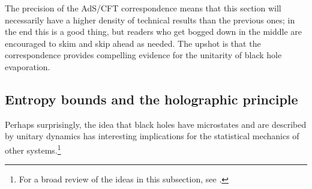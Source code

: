 \documentclass[12pt]{article}
\begin{document}
The precision of the AdS/CFT correspondence means that this section will necessarily have a higher density of technical results than the previous ones; in the end this is a good thing, but readers who get bogged down in the middle are encouraged to skim and skip ahead as needed.  The upshot is that the correspondence provides compelling evidence for the unitarity of black hole evaporation.

\subsection{Entropy bounds and the holographic principle}\label{holosec}
Perhaps surprisingly, the idea that black holes have microstates and are described by unitary dynamics has interesting implications for the statistical mechanics of other systems.\footnote{For a broad review of the ideas in this subsection, see \cite{Bousso:2002ju}.}  
\end{document}
